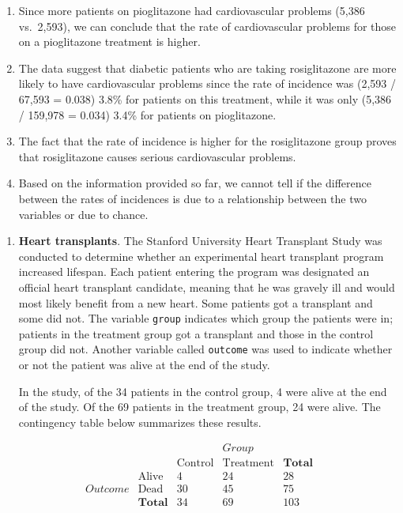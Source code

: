 \documentclass[
  letterpaper,
  DIV=11,
  numbers=noendperiod]{scrreprt}
\begin{document}
\begin{enumerate}
\def\labelenumi{\alph{enumi}.}
\item
  Since more patients on pioglitazone had cardiovascular problems (5,386
  vs.~2,593), we can conclude that the rate of cardiovascular problems
  for those on a pioglitazone treatment is higher.
\item
  The data suggest that diabetic patients who are taking rosiglitazone
  are more likely to have cardiovascular problems since the rate of
  incidence was (2,593 / 67,593 = 0.038) 3.8\% for patients on this
  treatment, while it was only (5,386 / 159,978 = 0.034) 3.4\% for
  patients on pioglitazone.
\item
  The fact that the rate of incidence is higher for the rosiglitazone
  group proves that rosiglitazone causes serious cardiovascular
  problems.
\item
  Based on the information provided so far, we cannot tell if the
  difference between the rates of incidences is due to a relationship
  between the two variables or due to chance.
\end{enumerate}

\begin{enumerate}
\def\labelenumi{\arabic{enumi}.}
\setcounter{enumi}{1}
\item
  \textbf{Heart transplants}. The Stanford University Heart Transplant
  Study was conducted to determine whether an experimental heart
  transplant program increased lifespan. Each patient entering the
  program was designated an official heart transplant candidate, meaning
  that he was gravely ill and would most likely benefit from a new
  heart. Some patients got a transplant and some did not. The variable
  \texttt{group} indicates which group the patients were in; patients in
  the treatment group got a transplant and those in the control group
  did not. Another variable called \texttt{outcome} was used to indicate
  whether or not the patient was alive at the end of the study.

  In the study, of the 34 patients in the control group, 4 were alive at
  the end of the study. Of the 69 patients in the treatment group, 24
  were alive. The contingency table below summarizes these results.
\end{enumerate}

\[
\begin{array}{cc|ccc} & & &\textit{Group}\\ 
& & \text{Control}  & \text{Treatment}  & \textbf{Total}  \\
& \hline \text{Alive}   & 4     & 24            & 28 \\
\textit{Outcome}& \text{Dead}   & 30        & 45            & 75  \\
& \textbf{Total}            & 34        & 69            & 103\\
\end{array} 
\]
\end{document}
